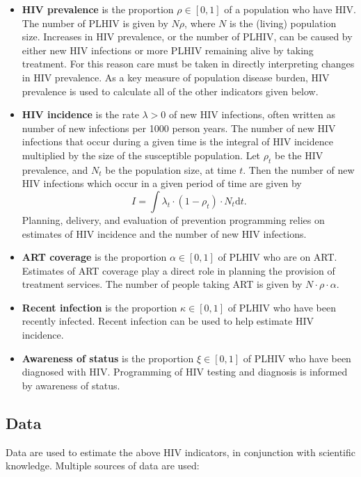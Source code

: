\documentclass[a4paper, nobind]{templates/ociamthesis}
\begin{document}
\begin{itemize}
\item
  \textbf{HIV prevalence} is the proportion \(\rho \in [0, 1]\) of a population who have HIV.
  The number of PLHIV is given by \(N\rho\), where \(N\) is the (living) population size.
  Increases in HIV prevalence, or the number of PLHIV, can be caused by either new HIV infections or more PLHIV remaining alive by taking treatment.
  For this reason care must be taken in directly interpreting changes in HIV prevalence.
  As a key measure of population disease burden, HIV prevalence is used to calculate all of the other indicators given below.
\item
  \textbf{HIV incidence} is the rate \(\lambda > 0\) of new HIV infections, often written as number of new infections per 1000 person years.
  The number of new HIV infections that occur during a given time is the integral of HIV incidence multiplied by the size of the susceptible population.
  Let \(\rho_t\) be the HIV prevalence, and \(N_t\) be the population size, at time \(t\).
  Then the number of new HIV infections which occur in a given period of time are given by
  \[
  I = \int \lambda_t \cdot (1 - \rho_t) \cdot N_t \text{d}t.
  \]
  Planning, delivery, and evaluation of prevention programming relies on estimates of HIV incidence and the number of new HIV infections.
\item
  \textbf{ART coverage} is the proportion \(\alpha \in [0, 1]\) of PLHIV who are on ART.
  Estimates of ART coverage play a direct role in planning the provision of treatment services.
  The number of people taking ART is given by \(N \cdot \rho \cdot \alpha\).
\item
  \textbf{Recent infection} is the proportion \(\kappa \in [0, 1]\) of PLHIV who have been recently infected.
  Recent infection can be used to help estimate HIV incidence.
\item
  \textbf{Awareness of status} is the proportion \(\xi \in [0, 1]\) of PLHIV who have been diagnosed with HIV.
  Programming of HIV testing and diagnosis is informed by awareness of status.
\end{itemize}

\hypertarget{data}{%
\subsection{Data}\label{data}}

Data are used to estimate the above HIV indicators, in conjunction with scientific knowledge.
Multiple sources of data are used:
\end{document}
